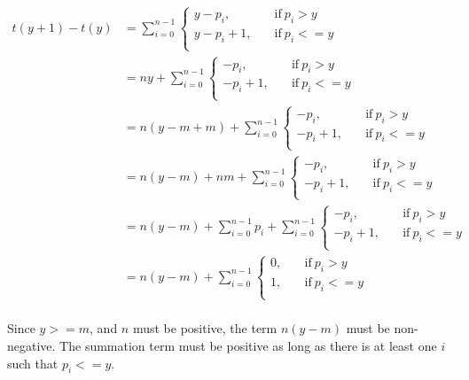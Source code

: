 \documentclass{article}
\begin{document}
\begin{equation*}
  \begin{split}
    t(y+1)-t(y) &= \sum_{i=0}^{n-1}
    \begin{cases}
      y - p_i, & \quad\text{if}\ p_i > y \\
      y - p_i + 1, & \quad\text{if}\ p_i <= y \\
    \end{cases} \\
    &= ny + \sum_{i=0}^{n-1}
    \begin{cases}
      -p_i, & \quad\text{if}\ p_i > y \\
      -p_i + 1, & \quad\text{if}\ p_i <= y \\
    \end{cases} \\
    &= n(y-m+m) + \sum_{i=0}^{n-1}
    \begin{cases}
      -p_i, & \quad\text{if}\ p_i > y \\
      -p_i + 1, & \quad\text{if}\ p_i <= y \\
    \end{cases} \\
    &= n(y-m) +nm + \sum_{i=0}^{n-1}
    \begin{cases}
      -p_i, & \quad\text{if}\ p_i > y \\
      -p_i + 1, & \quad\text{if}\ p_i <= y \\
    \end{cases} \\
    &= n(y-m) +\sum_{i=0}^{n-1} p_i + \sum_{i=0}^{n-1}
    \begin{cases}
      -p_i, & \quad\text{if}\ p_i > y \\
      -p_i + 1, & \quad\text{if}\ p_i <= y \\
    \end{cases} \\
    &= n(y-m) + \sum_{i=0}^{n-1}
    \begin{cases}
      0, & \quad\text{if}\ p_i > y \\
      1, & \quad\text{if}\ p_i <= y \\
    \end{cases} \\
  \end{split}
\end{equation*}

Since $y>=m$, and $n$ must be positive, the term $n(y-m)$ must be
non-negative. The summation term must be positive as long as there
is at least one $i$ such that $p_i <= y$.
\end{document}
